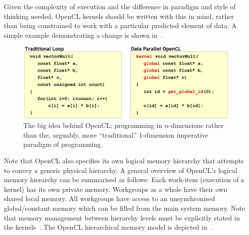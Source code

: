 \documentclass[a4paper,11pt]{article}
\begin{document}
Given the complexity of execution and the difference in paradigm and style of thinking needed, OpenCL kernels should be
written with this in mind, rather than being constrained to work with a particular predicted element of data.
A simple example demonstrating a change is shown in~.

\begin{figure}[ht]
  \centering
  \includegraphics[scale=0.2]{img/opencl_code}
  \caption{The big idea behind OpenCL; programming in $n$-dimensions rather than the, arguably, more ``traditional''
  $1$-dimension imperative paradigm of programming.~\cite{slides:KhronosOpenCLOverview}}
\label{fig:opencl-code}
\end{figure}

Note that OpenCL also specifies its own logical memory hierarchy that attempts to convey a generic physical hierarchy.
A general overview of OpenCL's logical memory hierarchy can be summarised as follows:
Each work-item (execution of a kernel) has its own private memory. Workgroups as a whole have their own shared
local memory. All workgroups have access to an unsynchronised global/constant memory which can be filled from the main
system memory. Note that memory management between hierarchy levels must be explicitly stated in the
kernels~\cite{slides:KhronosOpenCLOverview}. The OpenCL hierarchical memory model is depicted in~.
\end{document}
